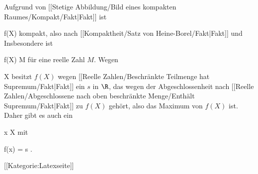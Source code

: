 Aufgrund von
[[Stetige Abbildung/Bild eines kompakten Raumes/Kompakt/Fakt|Fakt]]
ist

\mavergleichskette
{\vergleichskette
{ f(X)
}
{ \subseteq }{ \R
}
{  }{
}
{    }{
}
{   }{
}
}
{}{}{}
kompakt, also nach
[[Kompaktheit/Satz von Heine-Borel/Fakt|Fakt]]
und
Insbesondere ist

\mavergleichskette
{\vergleichskette
{ f(X)
}
{ \leq }{ M
}
{  }{
}
{    }{
}
{   }{
}
}
{}{}{}
für eine reelle Zahl $M$. Wegen

\mavergleichskette
{\vergleichskette
{ X
}
{ \neq }{ \emptyset
}
{  }{
}
{    }{
}
{   }{
}
}
{}{}{}
besitzt $f(X)$ wegen
[[Reelle Zahlen/Beschränkte Teilmenge hat Supremum/Fakt|Fakt]]
ein
$s$ in $\R$, das wegen der Abgeschlossenheit
nach [[Reelle Zahlen/Abgeschlossene nach oben beschränkte Menge/Enthält Supremum/Fakt|Fakt]]
zu $f(X)$ gehört, also das Maximum von $f(X)$ ist. Daher gibt es auch ein

\mavergleichskette
{\vergleichskette
{ x
}
{ \in }{ X
}
{  }{
}
{    }{
}
{   }{
}
}
{}{}{}
mit

\mavergleichskette
{\vergleichskette
{ f(x)
}
{ = }{ s
}
{  }{
}
{    }{
}
{   }{
}
}
{}{}{.}

 [[Kategorie:Latexseite]]
